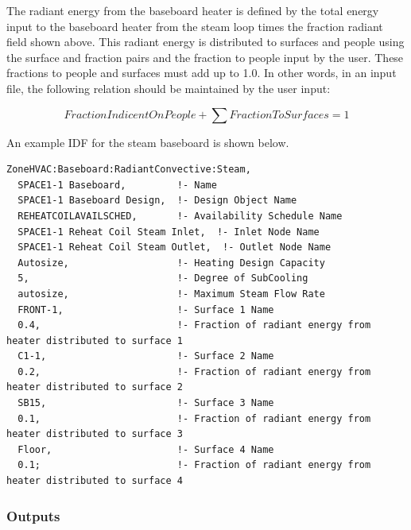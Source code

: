 The radiant energy from the baseboard heater is defined by the total energy input to the baseboard heater from the steam loop times the fraction radiant field shown above. This radiant energy is distributed to surfaces and people using the surface and fraction pairs and the fraction to people input by the user. These fractions to people and surfaces must add up to 1.0. In other words, in an input file, the following relation should be maintained by the user input:

\begin{equation}
FractionIndicentOnPeople + \sum {FractionToSurfaces = 1}
\end{equation}

An example IDF for the steam baseboard is shown below.

\begin{lstlisting}
ZoneHVAC:Baseboard:RadiantConvective:Steam,
  SPACE1-1 Baseboard,         !- Name
  SPACE1-1 Baseboard Design,  !- Design Object Name
  REHEATCOILAVAILSCHED,       !- Availability Schedule Name
  SPACE1-1 Reheat Coil Steam Inlet,  !- Inlet Node Name
  SPACE1-1 Reheat Coil Steam Outlet,  !- Outlet Node Name
  Autosize,                   !- Heating Design Capacity
  5,                          !- Degree of SubCooling
  autosize,                   !- Maximum Steam Flow Rate
  FRONT-1,                    !- Surface 1 Name
  0.4,                        !- Fraction of radiant energy from heater distributed to surface 1
  C1-1,                       !- Surface 2 Name
  0.2,                        !- Fraction of radiant energy from heater distributed to surface 2
  SB15,                       !- Surface 3 Name
  0.1,                        !- Fraction of radiant energy from heater distributed to surface 3
  Floor,                      !- Surface 4 Name
  0.1;                        !- Fraction of radiant energy from heater distributed to surface 4
\end{lstlisting}

\subsubsection{Outputs}\label{outputs-1-021}

